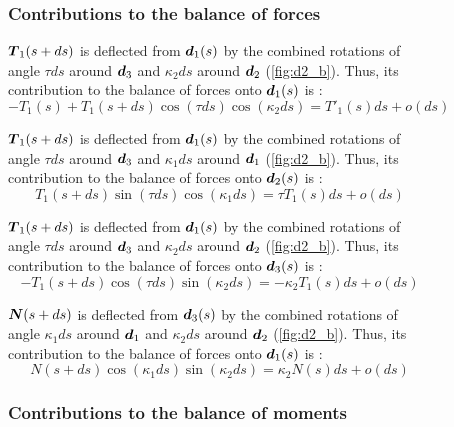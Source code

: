 \begin{figure}[p]
	\begin{fullpage}
	\subsubsection{Contributions to the balance of forces}
	\vspace{10pt}
	
	$\boldsymbol{T}_1(s+ds)$ is deflected from $\boldsymbol{d}_1(s)$ by the combined rotations of angle $\tau ds$ around $\boldsymbol{d}_3$ and $\kappa_2 ds$ around $\boldsymbol{d}_2$ (\cref{fig:d2_b}). Thus, its contribution to the balance of forces onto $\boldsymbol{d}_1(s)$ is : 
	\begin{equation*}
		-T_1(s) + T_1(s+ds) \cos(\tau ds) \cos(\kappa_2 ds) = T'_1 (s) ds + o(ds)
	\end{equation*}
	
	$\boldsymbol{T}_1(s+ds)$ is deflected from $\boldsymbol{d}_1(s)$ by the combined rotations of angle $\tau ds$ around $\boldsymbol{d}_3$ and $\kappa_1 ds$ around $\boldsymbol{d}_1$ (\cref{fig:d2_b}). Thus, its contribution to the balance of forces onto $\boldsymbol{d}_2(s)$ is : 
	\begin{equation*}
		T_1(s+ds) \sin(\tau ds) \cos(\kappa_1 ds) = \tau T_1 (s) ds + o(ds)
	\end{equation*}	
	
	$\boldsymbol{T}_1(s+ds)$ is deflected from $\boldsymbol{d}_1(s)$ by the combined rotations of angle $\tau ds$ around $\boldsymbol{d}_3$ and $\kappa_2 ds$ around $\boldsymbol{d}_2$ (\cref{fig:d2_b}). Thus, its contribution to the balance of forces onto $\boldsymbol{d}_3(s)$ is : 
	\begin{equation*}
		-T_1(s+ds) \cos(\tau ds) \sin(\kappa_2 ds) = - \kappa_2 T_1(s) ds + o(ds)
	\end{equation*}	
	
	$\boldsymbol{N}(s+ds)$ is deflected from $\boldsymbol{d}_3(s)$ by the combined rotations of angle $\kappa_1 ds$ around $\boldsymbol{d}_1$ and $\kappa_2 ds$ around $\boldsymbol{d}_2$ (\cref{fig:d2_b}). Thus, its contribution to the balance of forces onto $\boldsymbol{d}_1(s)$ is : 
	\begin{equation*}
		N(s+ds) \cos(\kappa_1 ds) \sin(\kappa_2 ds) = \kappa_2 N(s) ds + o(ds)
	\end{equation*}
	\vspace{10pt}

	\subsubsection{Contributions to the balance of moments}
	\vspace{10pt}
	

\end{fullpage}
\end{figure}
